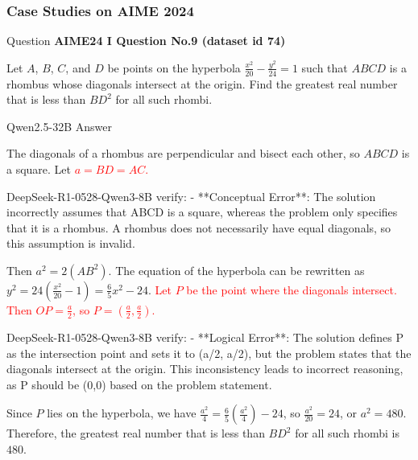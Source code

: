 \subsubsection{Case Studies on AIME 2024}
\label{supp_sec:aime24_case}


\begin{questionbox}{ Question }
\textbf{AIME24 I Question No.9 (dataset id 74)}\footnotemark

Let $A$, $B$, $C$, and $D$ be points on the hyperbola $\frac{x^2}{20}- \frac{y^2}{24} = 1$ such that $ABCD$ is a rhombus whose diagonals intersect at the origin. Find the greatest real number that is less than $BD^2$ for all such rhombi.
\end{questionbox}

\begin{answerbox}{Qwen2.5-32B Answer}

The diagonals of a rhombus are perpendicular and bisect each other, so $ABCD$ is a square. Let \textcolor{red}{$a = BD = AC$.}
\begin{tcolorbox}[
    colback=blue!5!white,         %
    colframe=blue!40!white,       %
]
DeepSeek-R1-0528-Qwen3-8B verify:  
- **Conceptual Error**: The solution incorrectly assumes that ABCD is a square, whereas the problem only specifies that it is a rhombus. A rhombus does not necessarily have equal diagonals, so this assumption is invalid.
\end{tcolorbox}

Then $a^2 = 2(AB^2)$. The equation of the hyperbola can be rewritten as $y^2 = 24\left(\frac{x^2}{20} - 1\right) = \frac{6}{5}x^2 - 24$. \textcolor{red}{Let $P$ be the point where the diagonals intersect. Then $OP = \frac{a}{2}$, so $P = \left(\frac{a}{2}, \frac{a}{2}\right)$.}

\begin{tcolorbox}[
    colback=blue!5!white,         %
    colframe=blue!40!white,       %
]
DeepSeek-R1-0528-Qwen3-8B verify:  
- **Logical Error**: The solution defines P as the intersection point and sets it to (a/2, a/2), but the problem states that the diagonals intersect at the origin. This inconsistency leads to incorrect reasoning, as P should be (0,0) based on the problem statement.
\end{tcolorbox}

Since $P$ lies on the hyperbola, we have $\frac{a^2}{4} = \frac{6}{5}\left(\frac{a^2}{4}\right) - 24$, so $\frac{a^2}{20} = 24$, or $a^2 = 480$. Therefore, the greatest real number that is less than $BD^2$ for all such rhombi is $\boxed{480}$.

\end{answerbox}


